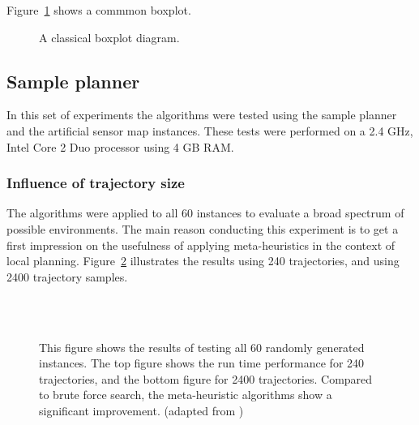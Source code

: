 Figure~\ref{fig:fig_boxplot} shows a commmon boxplot. 
\begin{figure}[thpb]
     \footnotesize
      \centering
       \def\svgwidth{\textwidth}
               
       \caption{A classical boxplot diagram.}
      \label{fig:fig_boxplot}
   \end{figure}

\subsection{Sample planner}
In this set of experiments the algorithms were tested using the sample planner and the artificial sensor map instances. 
These tests were performed on a 2.4 GHz, Intel Core 2 Duo processor using 4 GB RAM. 

\subsubsection{Influence of trajectory size}
The algorithms were applied to all 60 instances to evaluate a broad spectrum of possible environments. 
The main reason conducting this experiment is to get a first impression on the usefulness of applying meta-heuristics in the context of local planning. 
Figure~\ref{fig:fig_allworlds} illustrates the results using 240 trajectories, and using 2400 trajectory samples.

\begin{figure}[thpb]
   \myfloatalign
    \tiny
    \centering
    \\
        \\
    {
    \captionsetup[subfigure]{labelformat=empty} 
    }
    \caption[Experiment: All instances]{This figure shows the results of testing all 60 randomly generated instances. The top figure shows the run time performance for 240 trajectories, and the bottom figure for 2400 trajectories. Compared to brute force search, the meta-heuristic algorithms show a significant improvement. (adapted from \cite{myself})}
      \label{fig:fig_allworlds}
   \end{figure}

